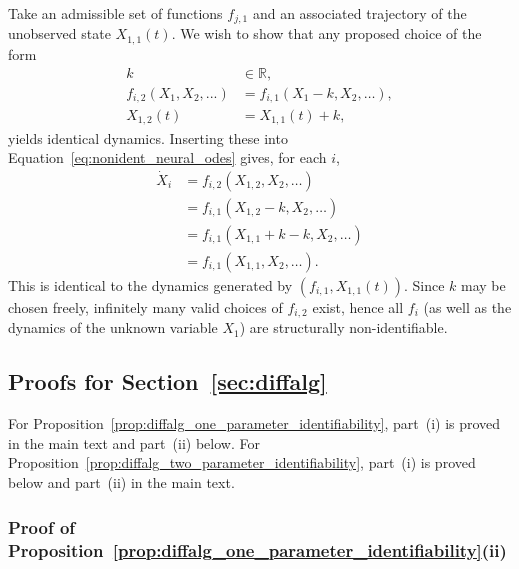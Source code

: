 \documentclass{article}
\theoremstyle{plain}
\theoremstyle{definition}
\begin{document}
{Take an admissible set of functions $f_{j,1}$ and an associated trajectory of the unobserved state $X_{1,1}(t)$. We wish to show that any proposed choice of the form
\begin{align*}
    k    &\in \mathbb{R}, \\
    f_{i,2}(X_1, X_2, ...) &= f_{i,1}(X_1 - k, X_2, \ldots),\\
    X_{1,2}(t) &= X_{1,1}(t) + k,
\end{align*}
yields identical dynamics. Inserting these into Equation~\eqref{eq:nonident_neural_odes} gives, for each $i$,
\begin{align*}
    \dot{X}_i &= f_{i,2}(X_{1,2}, X_2, \ldots) \\
              &= f_{i,1}(X_{1,2} - k, X_2, \ldots) \\
              &= f_{i,1}(X_{1,1} + k - k, X_2, \ldots) \\
              &= f_{i,1}(X_{1,1}, X_2, \ldots).
\end{align*}
This is identical to the dynamics generated by $(f_{i,1}, X_{1,1}(t))$. Since $k$ may be chosen freely, infinitely many valid choices of $f_{i,2}$ exist, hence all $f_i$ (as well as the dynamics of the unknown variable $X_1$) are structurally non-identifiable.


\subsection{Proofs for Section~\ref{sec:diffalg}} \label{appendix:proofs_section3}

For Proposition~\ref{prop:diffalg_one_parameter_identifiability}, part~(i) is proved in the main text and part~(ii) below. For Proposition~\ref{prop:diffalg_two_parameter_identifiability}, part~(i) is proved below and part~(ii) in the main text.

\subsubsection{Proof of Proposition~\ref{prop:diffalg_one_parameter_identifiability}(ii)} \label{appendix:proof_case2}

}
\end{document}
